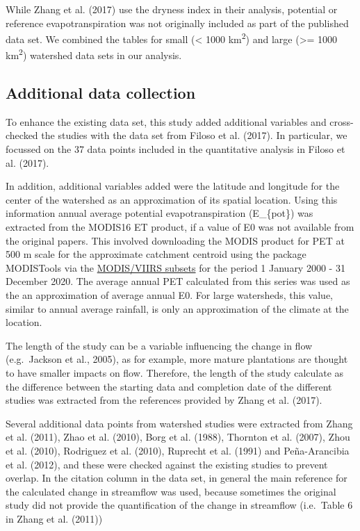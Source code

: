 \documentclass[]{elsarticle} %
\begin{document}
While Zhang et al. (2017) use the dryness index in their analysis,
potential or reference evapotranspiration was not originally included as
part of the published data set. We combined the tables for small
(\textless{} 1000 km\textsuperscript{2}) and large (\textgreater= 1000
km\textsuperscript{2}) watershed data sets in our analysis.

\hypertarget{additional-data-collection}{%
\subsection{Additional data
collection}\label{additional-data-collection}}

To enhance the existing data set, this study added additional variables
and cross-checked the studies with the data set from Filoso et al.
(2017). In particular, we focussed on the 37 data points included in the
quantitative analysis in Filoso et al. (2017).

In addition, additional variables added were the latitude and longitude
for the center of the watershed as an approximation of its spatial
location. Using this information annual average potential
evapotranspiration (E\_\{pot\}) was extracted from the MODIS16 ET
product, if a value of E0 was not available from the original papers.
This involved downloading the MODIS product for PET at 500 m scale for
the approximate catchment centroid using the package MODISTools via the
\href{https://modis.ornl.gov/data/modis_webservice.html}{MODIS/VIIRS
subsets} for the period 1 January 2000 - 31 December 2020. The average
annual PET calculated from this series was used as the an approximation
of average annual E0. For large watersheds, this value, similar to
annual average rainfall, is only an approximation of the climate at the
location.

The length of the study can be a variable influencing the change in flow
(e.g.~Jackson et al., 2005), as for example, more mature plantations are
thought to have smaller impacts on flow. Therefore, the length of the
study calculate as the difference between the starting data and
completion date of the different studies was extracted from the
references provided by Zhang et al. (2017).

Several additional data points from watershed studies were extracted
from Zhang et al. (2011), Zhao et al. (2010), Borg et al. (1988),
Thornton et al. (2007), Zhou et al. (2010), Rodriguez et al. (2010),
Ruprecht et al. (1991) and Peña-Arancibia et al. (2012), and these were
checked against the existing studies to prevent overlap. In the citation
column in the data set, in general the main reference for the calculated
change in streamflow was used, because sometimes the original study did
not provide the quantification of the change in streamflow (i.e.~Table 6
in Zhang et al. (2011))
\end{document}
